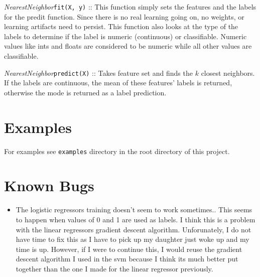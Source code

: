 \documentclass{article}
\begin{document}
\textit{NearestNeighbor}\texttt{fit(X, y)} :: This function simply sets the
features and the labels for the predit function. Since there is no real learning
going on, no weights, or learning artifacts need to persist. This function also
looks at the type of the labels to determine if the label is numeric
(continuous) or classifiable. Numeric values like ints and floats are considered
to be numeric while all other values are classifiable.

\textit{NearestNeighbor}\texttt{predict(X)} :: Takes feature set and finds the
$k$ closest neighbors. If the labels are continuous, the mean of these features'
labels is returned, otherwise the mode is returned as a label prediction.

\section{Examples}

For examples see \texttt{examples} directory in the root directory of this project.

\section{Known Bugs}

\begin{itemize}
    \item The logistic regressors training doesn't seem to work sometimes.. This
      seems to happen when values of 0 and 1 are used as labels. I think this is
      a problem with the linear regressors gradient descent algorithm.
      Unforunately, I do not have time to fix this as I have to pick up my
      daughter just woke up and my time is up. However, if I were to continue
      this, I would reuse the gradient descent algorithm I used in the svm
      because I think its much better put together than the one I made for the
      linear regressor previously.
\end{itemize}
\end{document}
